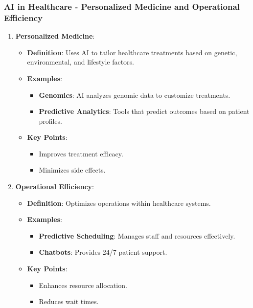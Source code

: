 \documentclass{beamer}
\begin{document}
\begin{frame}[fragile]
    \frametitle{AI in Healthcare - Personalized Medicine and Operational Efficiency}
    \begin{enumerate}
        \item \textbf{Personalized Medicine}:
        \begin{itemize}
            \item \textbf{Definition}: Uses AI to tailor healthcare treatments based on genetic, environmental, and lifestyle factors.
            \item \textbf{Examples}:
            \begin{itemize}
                \item \textbf{Genomics}: AI analyzes genomic data to customize treatments.
                \item \textbf{Predictive Analytics}: Tools that predict outcomes based on patient profiles.
            \end{itemize}
            \item \textbf{Key Points}:
            \begin{itemize}
                \item Improves treatment efficacy.
                \item Minimizes side effects.
            \end{itemize}
        \end{itemize}
        
        \item \textbf{Operational Efficiency}:
        \begin{itemize}
            \item \textbf{Definition}: Optimizes operations within healthcare systems.
            \item \textbf{Examples}:
            \begin{itemize}
                \item \textbf{Predictive Scheduling}: Manages staff and resources effectively.
                \item \textbf{Chatbots}: Provides 24/7 patient support.
            \end{itemize}
            \item \textbf{Key Points}:
            \begin{itemize}
                \item Enhances resource allocation.
                \item Reduces wait times.
            \end{itemize}
        \end{itemize}
    \end{enumerate}
\end{frame}
\end{document}
